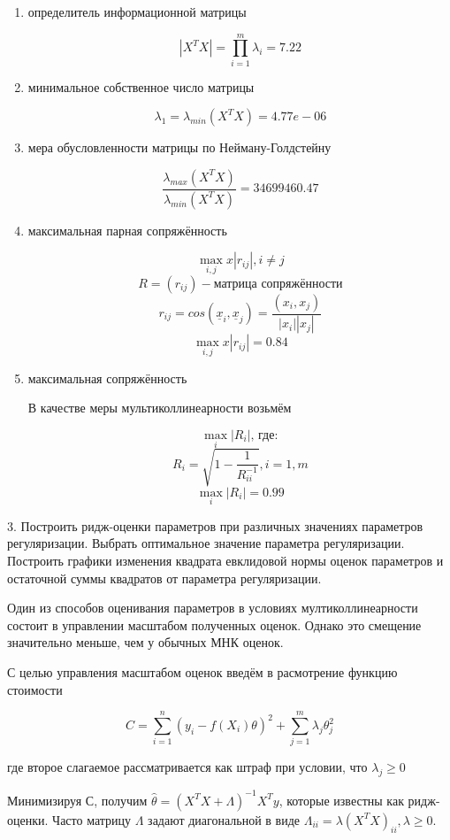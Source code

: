 ﻿\documentclass[12pt, a4paper]{article}
\begin{document}
\begin{enumerate}

\item определитель информационной матрицы 

\[
|X^T X| = \prod_{i=1}^m \lambda_i = 7.22
\]

\item минимальное собственное число матрицы

\[
\lambda_1 = \lambda_{min}(X^T X) = 4.77e-06
\]

\item мера обусловленности матрицы по Нейману-Голдстейну

\[
\frac{\lambda_{max}(X^T X)}{\lambda_{min}(X^T X)} = 34699460.47
\]

\item максимальная парная сопряжённость

\[
\max\limits_{i,j}x|r_{ij}|, i \neq j 
\]
\[
R = (r_{ij}) - \text{матрица сопряжённости}
\]
\[
r_{ij} = cos(\underline{x}_i,\underline{x}_j) = \frac{(x_i, x_j)}{|x_i| |x_j|}
\]
\[
\max\limits_{i,j}x|r_{ij}| = 0.84
\]


\item максимальная сопряжённость

В качестве меры мультиколлинеарности возьмём 

\[
\max\limits_{i}|R_i|\text{, где}:
\]
\[
R_i = \sqrt{1 - \frac{1}{R_{ii}^{-1}}}, i=1,m
\]
\[
\max\limits_{i}|R_i| = 0.99
\]


\end{enumerate}


3. Построить ридж-оценки параметров при различных значениях параметров регуляризации. Выбрать оптимальное значение параметра регуляризации.
Построить графики изменения квадрата евклидовой нормы оценок параметров и остаточной суммы квадратов от параметра регуляризации.


Один из способов оценивания параметров в условиях мултиколлинеарности
 состоит в управлении масштабом полученных оценок. Однако это смещение значительно меньше, чем у обычных МНК оценок.
 
С целью управления масштабом оценок введём в расмотрение функцию стоимости

\[
C = \sum_{i=1}^{n}(y_i - f(X_i)\theta)^2 + \sum_{j=1}^{m}{\lambda_j \theta_j^2} 
\]

где второе слагаемое рассматривается как штраф при условии, что $\lambda_j \geq 0$

Минимизируя С, получим $\hat{\theta} = (X^TX + \Lambda)^{-1}X^Ty$, которые известны как ридж-оценки. Часто матрицу $\Lambda$ задают диагональной в виде $\Lambda_{ii} = \lambda (X^TX)_{ii}, \lambda \geq 0$.
\end{document}
